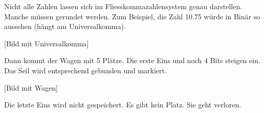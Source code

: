 \begin{beispiel}
Nicht alle Zahlen lassen sich im Fliesskommazahlensystem genau darstellen. Manche müssen gerundet werden.
Zum Beispiel, die Zahl 10.75 würde in Binär so aussehen (hängt am Universalkomma).

[Bild mit Universalkomma]

Dann kommt der Wagen mit 5 Plätze. Die erste Eins und noch 4 Bits steigen ein. Das Seil wird entsprechend gebunden und markiert.

[Bild mit Wagen]

Die letzte Eins wird nicht gespeichert. Es gibt kein Platz. Sie geht verloren.
\end{beispiel}
